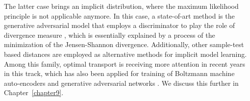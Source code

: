 The latter case brings an implicit distribution, where the maximum likelihood principle is not applicable anymore. In this case, a state-of-art method is the generative adversarial model that employs a discriminator to play the role of divergence measure \cite{goodfellow2014gan, 2017arXiv170104862A, NIPS2016_6125}, which is essentially explained by a process of the minimization of the Jensen-Shannon divergence. Additionally, other sample-test based distances are employed as alternative methods for implicit model learning. Among this family, optimal transport is receiving more attention in recent years \cite{santambrogio2015optimal, 2013arXiv1306.0895C} in this track, which has also been applied for training of Boltzmann machine \cite{NIPS2016_6248} auto-encoders\cite{2017arXiv171101558T} and generative adversarial networks \cite{2017arXiv170107875A}. We discuss this further in Chapter~\ref{chapter9}.



